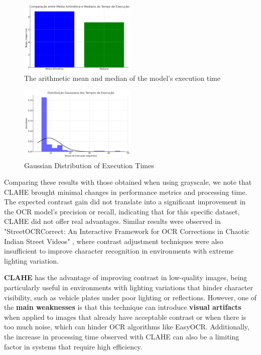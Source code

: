 \documentclass[conference]{IEEEtran}
\begin{document}
    \begin{figure}[htbp]
        \centerline{\includegraphics[width=0.5\textwidth]{img11.png}}
        \caption{The arithmetic mean and median of the model's execution time}
        \label{img11}
    \end{figure}
    
    \begin{figure}[htbp]
        \centerline{\includegraphics[width=0.5\textwidth]{img12.png}}
        \caption{Gaussian Distribution of Execution Times}
        \label{img12}
    \end{figure}
    
    Comparing these results with those obtained when using grayscale, we note that CLAHE brought minimal changes in performance metrics and processing time. The expected contrast gain did not translate into a significant improvement in the OCR model's precision or recall, indicating that for this specific dataset, CLAHE did not offer real advantages. Similar results were observed in "StreetOCRCorrect: An Interactive Framework for OCR Corrections in Chaotic Indian Street Videos" \cite{b13}, where contrast adjustment techniques were also insufficient to improve character recognition in environments with extreme lighting variation.
    
    \textbf{CLAHE} has the advantage of improving contrast in low-quality images, being particularly useful in environments with lighting variations that hinder character visibility, such as vehicle plates under poor lighting or reflections. However, one of the \textbf{main weaknesses} is that this technique can introduce \textbf{visual artifacts} when applied to images that already have acceptable contrast or when there is too much noise, which can hinder OCR algorithms like EasyOCR. Additionally, the increase in processing time observed with CLAHE can also be a limiting factor in systems that require high efficiency.
    
\end{document}
